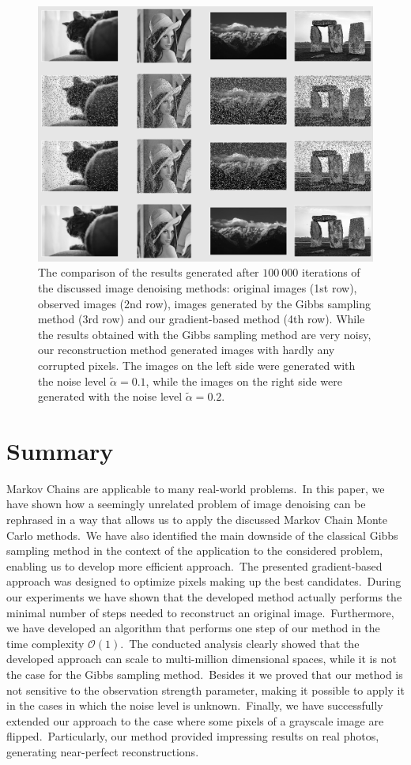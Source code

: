 \documentclass[a4paper, 11pt, onecolumn, openany, titlepage]{report}
\newcommand\numberedchapter[1]{\setlength\topskip{3cm}\chapter{#1}\setlength\topskip{0cm}}
\theoremstyle{default_theorem_style}\newtheorem{theorem}{Theorem}
\theoremstyle{default_theorem_style}\newtheorem{definition}{Definition}
\begin{document}
\begin{figure}[H]
\centering
\includegraphics[scale=0.42]{grayscale_qualitative_results}
\caption{The comparison of the results generated after $100\ 000$ iterations of the discussed image denoising
methods: original images (1st row), observed images (2nd row), images generated by the Gibbs
sampling method (3rd row) and our gradient-based method (4th row). While the results obtained with the Gibbs
sampling method are very noisy, our reconstruction method generated images with hardly any corrupted pixels. The
images on the left side were generated with the noise level $\tilde{\alpha} = 0.1$, while the images on the right
side were generated with the noise level $\tilde{\alpha} = 0.2$.}
\label{fig:grayscale_qualitative_results}
\end{figure}

\numberedchapter{Summary}

Markov Chains are applicable to many real-world problems.\ In this paper, we have shown how a seemingly unrelated
problem of image denoising can be rephrased in a way that allows us to apply the discussed Markov Chain Monte Carlo
methods.\ We have also identified the main downside of the classical Gibbs sampling method in the context of the
application to the considered problem, enabling us to develop more efficient approach.\ The presented
gradient-based approach was designed to optimize pixels making up the best candidates.\ During our experiments we have
shown that the developed method actually performs the minimal number of steps needed to reconstruct an original
image.\ Furthermore, we have developed an algorithm that performs one step of our method in the time complexity
$\mathcal{O}(1)$.\ The conducted analysis clearly showed that the developed approach can scale to multi-million
dimensional spaces, while it is not the case for the Gibbs sampling method.\ Besides it we proved that our method is
not sensitive to the observation strength parameter, making it possible to apply it in the cases in which the
noise level is unknown.\ Finally, we have successfully extended our approach to the case where some pixels of
a grayscale image are flipped.\ Particularly, our method provided impressing results on real photos, generating
near-perfect reconstructions.\newline
\end{document}
